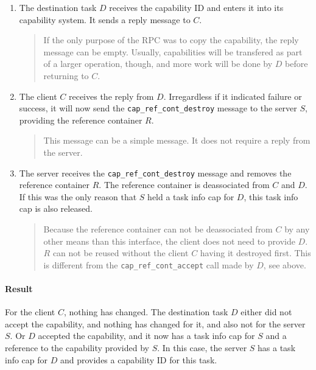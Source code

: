 \documentclass[9pt,a4paper]{extarticle}
\newenvironment{comment}{\footnotesize \begin{quote}}{\end{quote}}
\begin{document}
\begin{enumerate}
\item The destination task $D$ receives the capability ID and enters
  it into its capability system.  It sends a reply message to $C$.

  \begin{comment}
    If the only purpose of the RPC was to copy the capability, the
    reply message can be empty.  Usually, capabilities will be
    transfered as part of a larger operation, though, and more work
    will be done by $D$ before returning to $C$.
  \end{comment}
  
\item \label{copycapout} The client $C$ receives the reply from $D$.
  Irregardless if it indicated failure or success, it will now send
  the \verb/cap_ref_cont_destroy/ message to the server $S$, providing
  the reference container $R$.

  \begin{comment}
    This message can be a simple message.  It does not require a reply
    from the server.
  \end{comment}
  
\item The server receives the \verb/cap_ref_cont_destroy/ message and
  removes the reference container $R$.  The reference container is
  deassociated from $C$ and $D$.  If this was the only reason that $S$
  held a task info cap for $D$, this task info cap is also released.

  \begin{comment}
    Because the reference container can not be deassociated from $C$
    by any other means than this interface, the client does not need
    to provide $D$.  $R$ can not be reused without the client $C$
    having it destroyed first.  This is different from the
    \verb/cap_ref_cont_accept/ call made by $D$, see above.
  \end{comment}

\end{enumerate}

\paragraph{Result}
For the client $C$, nothing has changed.  The destination task $D$
either did not accept the capability, and nothing has changed for it,
and also not for the server $S$.  Or $D$ accepted the capability, and
it now has a task info cap for $S$ and a reference to the capability
provided by $S$.  In this case, the server $S$ has a task info cap for
$D$ and provides a capability ID for this task.
\end{document}

